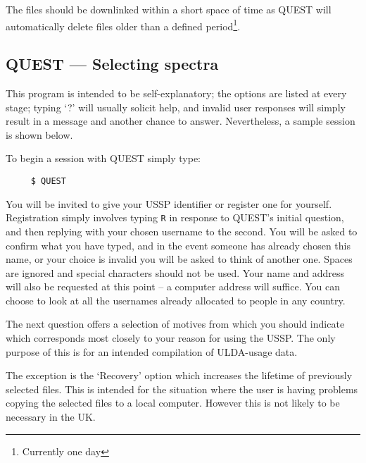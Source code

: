 The files should be downlinked within a short space of time
as QUEST will automatically delete files older than a defined
period\footnote{Currently one day}.

\subsection{QUEST --- Selecting spectra}

This program is intended to be self-explanatory; the options are listed
at every stage; typing `?' will usually solicit help, and invalid user
responses will simply result in a message and another chance to answer.
Nevertheless, a sample session is shown  below.

To begin a session with QUEST simply type:
\begin{verbatim}
     $ QUEST
\end{verbatim}
You will be invited to give your USSP identifier or register one for yourself.
Registration simply involves typing {\tt R} in response to QUEST's initial
question, and then replying with your chosen username to the second.
You will be asked to confirm what you have typed, and in the event someone has
already chosen this name, or your choice is invalid you will be asked to think
of another one. Spaces are ignored and special characters should not be used.
Your  name and address will also be requested at this point -- a computer
address will suffice.
You can choose to look at all the usernames already allocated to
people in any country.


The next question offers a selection of motives from which you should
indicate which corresponds most closely to your reason
for using the USSP.
The only purpose of this is for an intended compilation of ULDA-usage data.

The exception is the `Recovery' option which
increases the lifetime of previously selected files.
This is intended for the situation where the user is having problems copying
the selected files to a local computer.
However this is not likely to be necessary in the UK.

